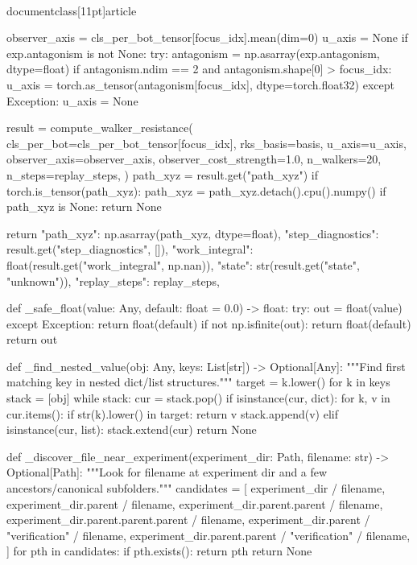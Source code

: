 \\documentclass[11pt]{article}
\begin{document}
\begin{CodeBlock}
    observer_axis = cls_per_bot_tensor[focus_idx].mean(dim=0)
    u_axis = None
    if exp.antagonism is not None:
        try:
            antagonism = np.asarray(exp.antagonism, dtype=float)
            if antagonism.ndim == 2 and antagonism.shape[0] > focus_idx:
                u_axis = torch.as_tensor(antagonism[focus_idx], dtype=torch.float32)
        except Exception:
            u_axis = None

    result = compute_walker_resistance(
        cls_per_bot=cls_per_bot_tensor[focus_idx],
        rks_basis=basis,
        u_axis=u_axis,
        observer_axis=observer_axis,
        observer_cost_strength=1.0,
        n_walkers=20,
        n_steps=replay_steps,
    )
    path_xyz = result.get("path_xyz")
    if torch.is_tensor(path_xyz):
        path_xyz = path_xyz.detach().cpu().numpy()
    if path_xyz is None:
        return None

    return {
        "path_xyz": np.asarray(path_xyz, dtype=float),
        "step_diagnostics": result.get("step_diagnostics", []),
        "work_integral": float(result.get("work_integral", np.nan)),
        "state": str(result.get("state", "unknown")),
        "replay_steps": replay_steps,
    }


def _safe_float(value: Any, default: float = 0.0) -> float:
    try:
        out = float(value)
    except Exception:
        return float(default)
    if not np.isfinite(out):
        return float(default)
    return out


def _find_nested_value(obj: Any, keys: List[str]) -> Optional[Any]:
    """Find first matching key in nested dict/list structures."""
    target = {k.lower() for k in keys}
    stack = [obj]
    while stack:
        cur = stack.pop()
        if isinstance(cur, dict):
            for k, v in cur.items():
                if str(k).lower() in target:
                    return v
                stack.append(v)
        elif isinstance(cur, list):
            stack.extend(cur)
    return None


def _discover_file_near_experiment(experiment_dir: Path, filename: str) -> Optional[Path]:
    """Look for filename at experiment dir and a few ancestors/canonical subfolders."""
    candidates = [
        experiment_dir / filename,
        experiment_dir.parent / filename,
        experiment_dir.parent.parent / filename,
        experiment_dir.parent.parent.parent / filename,
        experiment_dir.parent / "verification" / filename,
        experiment_dir.parent.parent / "verification" / filename,
    ]
    for pth in candidates:
        if pth.exists():
            return pth
    return None



\end{CodeBlock}
\end{document}

